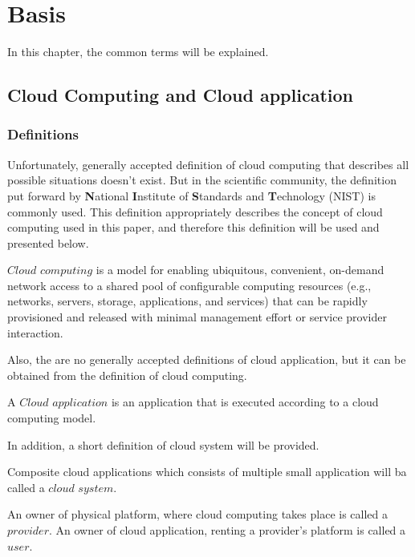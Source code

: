
\chapter{Basis}
\label{chap:basis}
In this chapter, the common terms will be explained.
\section{Cloud Computing and Cloud application} \label{sec:cloud}

\subsection{Definitions}
Unfortunately, generally accepted definition of cloud computing that describes all possible situations doesn't exist. 
But in the scientific community, the definition put forward by \textbf{N}ational \textbf{I}nstitute of \textbf{S}tandards and \textbf{T}echnology (NIST) is commonly used. 
This definition appropriately describes the concept of cloud computing used in this paper, and therefore this definition will be used and presented below.
\begin{definition}
	\label{def:nist}
$Cloud$ $computing$ is a model for enabling ubiquitous, convenient, on-demand network access to a shared
pool of configurable computing resources (e.g., networks, servers, storage, applications, and services) that
can be rapidly provisioned and released with minimal management effort or service provider interaction. \cite*{nist}
\end{definition}
Also, the are no generally accepted definitions of cloud application, but it can be obtained from the definition of cloud computing.
\begin{definition} 
	\label{def:capp}
	A $Cloud$ $application$ is an application that is executed according to a cloud computing model. \cite*{cloudapp}
\end{definition} 
In addition, a short definition of cloud system will be provided.
\begin{definition} 
	\label{def:csys}
Composite cloud applications which consists of multiple small application will ba called a $cloud$ $system$.
\end{definition} 
An owner of physical platform, where cloud computing takes place is called a $provider$.
An owner of cloud application, renting a provider's platform is called a $user$.
